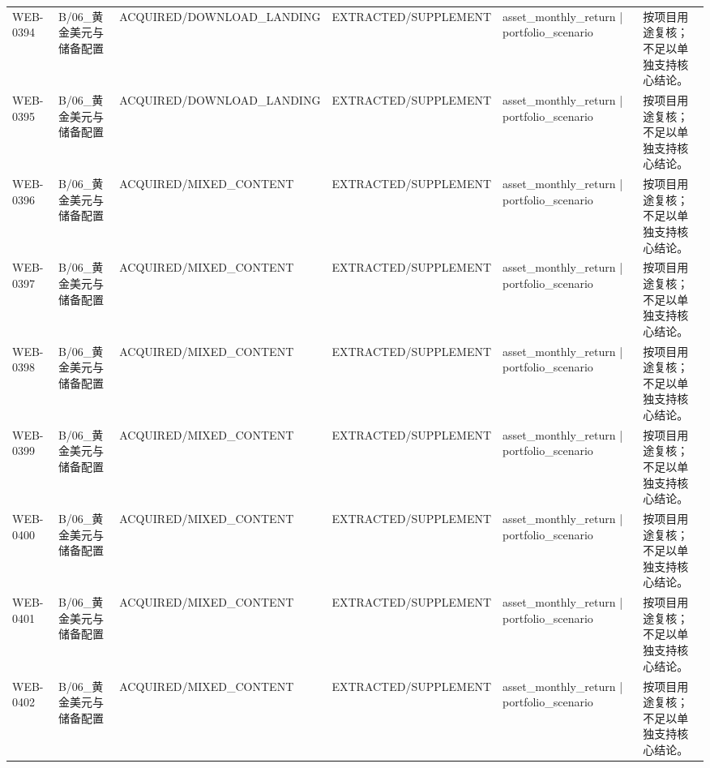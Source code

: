 \begin{landscape}
\begin{longtable}{p{1.8cm}p{2.6cm}p{2.6cm}p{2.6cm}p{4.8cm}p{7.2cm}}
WEB-0394 & B/\allowbreak{}06\_\allowbreak{}黄金美元与储备配置 & ACQUIRED/\allowbreak{}DOWNLOAD\_\allowbreak{}LANDING & EXTRACTED/\allowbreak{}SUPPLEMENT & asset\_\allowbreak{}monthly\_\allowbreak{}return | portfolio\_\allowbreak{}scenario & 按项目用途复核；不足以单独支持核心结论。\\
WEB-0395 & B/\allowbreak{}06\_\allowbreak{}黄金美元与储备配置 & ACQUIRED/\allowbreak{}DOWNLOAD\_\allowbreak{}LANDING & EXTRACTED/\allowbreak{}SUPPLEMENT & asset\_\allowbreak{}monthly\_\allowbreak{}return | portfolio\_\allowbreak{}scenario & 按项目用途复核；不足以单独支持核心结论。\\
WEB-0396 & B/\allowbreak{}06\_\allowbreak{}黄金美元与储备配置 & ACQUIRED/\allowbreak{}MIXED\_\allowbreak{}CONTENT & EXTRACTED/\allowbreak{}SUPPLEMENT & asset\_\allowbreak{}monthly\_\allowbreak{}return | portfolio\_\allowbreak{}scenario & 按项目用途复核；不足以单独支持核心结论。\\
WEB-0397 & B/\allowbreak{}06\_\allowbreak{}黄金美元与储备配置 & ACQUIRED/\allowbreak{}MIXED\_\allowbreak{}CONTENT & EXTRACTED/\allowbreak{}SUPPLEMENT & asset\_\allowbreak{}monthly\_\allowbreak{}return | portfolio\_\allowbreak{}scenario & 按项目用途复核；不足以单独支持核心结论。\\
WEB-0398 & B/\allowbreak{}06\_\allowbreak{}黄金美元与储备配置 & ACQUIRED/\allowbreak{}MIXED\_\allowbreak{}CONTENT & EXTRACTED/\allowbreak{}SUPPLEMENT & asset\_\allowbreak{}monthly\_\allowbreak{}return | portfolio\_\allowbreak{}scenario & 按项目用途复核；不足以单独支持核心结论。\\
WEB-0399 & B/\allowbreak{}06\_\allowbreak{}黄金美元与储备配置 & ACQUIRED/\allowbreak{}MIXED\_\allowbreak{}CONTENT & EXTRACTED/\allowbreak{}SUPPLEMENT & asset\_\allowbreak{}monthly\_\allowbreak{}return | portfolio\_\allowbreak{}scenario & 按项目用途复核；不足以单独支持核心结论。\\
WEB-0400 & B/\allowbreak{}06\_\allowbreak{}黄金美元与储备配置 & ACQUIRED/\allowbreak{}MIXED\_\allowbreak{}CONTENT & EXTRACTED/\allowbreak{}SUPPLEMENT & asset\_\allowbreak{}monthly\_\allowbreak{}return | portfolio\_\allowbreak{}scenario & 按项目用途复核；不足以单独支持核心结论。\\
WEB-0401 & B/\allowbreak{}06\_\allowbreak{}黄金美元与储备配置 & ACQUIRED/\allowbreak{}MIXED\_\allowbreak{}CONTENT & EXTRACTED/\allowbreak{}SUPPLEMENT & asset\_\allowbreak{}monthly\_\allowbreak{}return | portfolio\_\allowbreak{}scenario & 按项目用途复核；不足以单独支持核心结论。\\
WEB-0402 & B/\allowbreak{}06\_\allowbreak{}黄金美元与储备配置 & ACQUIRED/\allowbreak{}MIXED\_\allowbreak{}CONTENT & EXTRACTED/\allowbreak{}SUPPLEMENT & asset\_\allowbreak{}monthly\_\allowbreak{}return | portfolio\_\allowbreak{}scenario & 按项目用途复核；不足以单独支持核心结论。\\

\end{longtable}
\end{landscape}
